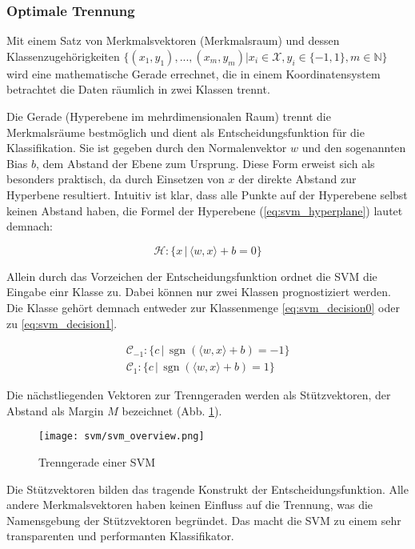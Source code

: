 \subsubsection{Optimale Trennung}
Mit einem Satz von Merkmalsvektoren (Merkmalsraum) und dessen Klassenzugehörigkeiten $\{ (x_1, y_1), ..., (x_m, y_m) | x_i \in \mathcal{X}, y_i \in \{-1, 1\}, m \in \mathbb{N} \}$ wird eine mathematische Gerade errechnet,
die in einem Koordinatensystem betrachtet die Daten räumlich in zwei Klassen trennt. 

Die Gerade (Hyperebene im mehrdimensionalen Raum) trennt die Merkmalsräume bestmöglich und dient als Entscheidungsfunktion für die Klassifikation. Sie ist gegeben durch den Normalenvektor $w$ und den sogenannten Bias $b$, dem Abstand der Ebene zum Ursprung. Diese Form erweist sich als besonders praktisch, da durch Einsetzen von $x$ der direkte Abstand zur Hyperbene resultiert.
Intuitiv ist klar, dass alle Punkte auf der Hyperebene selbst keinen Abstand haben, die Formel der Hyperebene (\ref{eq:svm_hyperplane}) lautet demnach: 
 
\begin{equation}
\label{eq:svm_hyperplane}
    \mathcal{H}: \{ x \,|\, \langle w,x \rangle + b = 0 \}
\end{equation}
 
Allein durch das Vorzeichen der Entscheidungsfunktion ordnet die \ac{SVM} die Eingabe einr Klasse zu. Dabei können nur zwei Klassen  prognostiziert werden. Die Klasse gehört demnach entweder zur Klassenmenge \ref{eq:svm_decision0} oder zu \ref{eq:svm_decision1}.

\begin{eqnarray}
    \mathcal{C}_{-1}: \{ c \,|\, \operatorname{sgn}(\langle w,x \rangle + b) = -1 \} \label{eq:svm_decision0} \\
    \mathcal{C}_1: \{ c \,|\, \operatorname{sgn}(\langle w,x \rangle + b) = 1 \} \label{eq:svm_decision1}
\end{eqnarray}

Die nächstliegenden Vektoren zur Trenngeraden werden als Stützvektoren, der Abstand als Margin $M$ bezeichnet (Abb. \ref{fig:svm_separator}). 

\begin{figure}[htbp] \centering
    \texttt{[image: svm/svm\_overview.png]}
    \caption{Trenngerade einer SVM}
    \label{fig:svm_separator}
\end{figure}

Die Stützvektoren bilden das tragende Konstrukt der Entscheidungsfunktion. 
Alle andere Merkmalsvektoren haben keinen Einfluss auf die Trennung, was die Namensgebung der Stützvektoren begründet. 
Das macht die \ac{SVM} zu einem sehr transparenten und performanten Klassifikator. 

